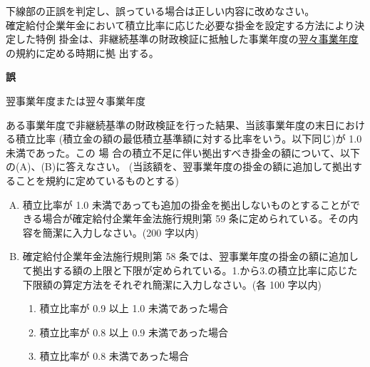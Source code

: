 \begin{truefalse}[年金2 H28 問題1(1)]
    下線部の正誤を判定し、誤っている場合は正しい内容に改めなさい。
\\

  確定給付企業年金において積立比率に応じた必要な掛金を設定する方法により決定した特例
  掛金は、非継続基準の財政検証に抵触した事業年度の\underline{翌々事業年度}の規約に定める時期に拠
  出する。
\end{truefalse}

\begin{answerbox}
  \textbf{誤}

  翌事業年度または翌々事業年度
\end{answerbox}

\begin{shortanswer}[年金2 2025 問題2(3)]
  ある事業年度で非継続基準の財政検証を行った結果、当該事業年度の末日における積立比率 
  (積立金の額の最低積立基準額に対する比率をいう。以下同じ)が 1.0 未満であった。この
  場 合の積立不足に伴い拠出すべき掛金の額について、以下の(A)、(B)に答えなさい。
  (当該額を、翌事業年度の掛金の額に追加して拠出することを規約に定めているものとする)

  \begin{enumerate}[(A)]
    \item 積立比率が 1.0 未満であっても追加の掛金を拠出しないものとすることができる場合が確定給付企業年金法施行規則第 59 条に定められている。その内容を簡潔に入力しなさい。(200 字以内)
    \\
    \item 確定給付企業年金法施行規則第 58 条では、翌事業年度の掛金の額に追加して拠出する額の上限と下限が定められている。1.から3.の積立比率に応じた下限額の算定方法をそれぞれ簡潔に入力しなさい。(各 100 字以内)
    \\
    \begin{enumerate}[1. ]
      \item 積立比率が 0.9 以上 1.0 未満であった場合
      \item 積立比率が 0.8 以上 0.9 未満であった場合
      \item 積立比率が 0.8 未満であった場合
    \end{enumerate}
  \end{enumerate}

\end{shortanswer}


